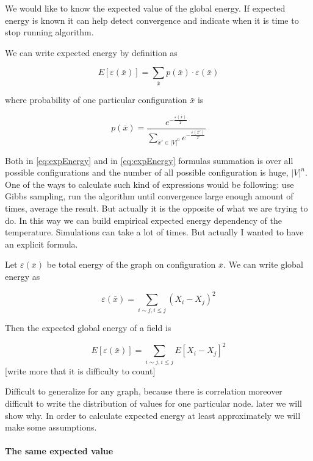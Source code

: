 \documentclass[12pt]{report}
\begin{document}
We would like to know the expected value of the global energy. 
If expected energy is known it can help detect convergence and indicate when it is time to stop running algorithm. 


We can write expected energy by definition as

\begin{equation}
E[\varepsilon (\bar{x})] = \sum\limits_{\bar{x}} p(\bar{x}) \cdot \varepsilon(\bar{x})
\end{equation}\label{eq:expEnergy}


where probability of one particular configuration $\bar{x}$ is  

\begin{equation}
p(\bar{x}) = \frac{ e^{-\frac{ \varepsilon (\bar{x})}{T}} }{ \sum\limits_{\bar{x}'\in |V|^n} e^{-\frac{\varepsilon(\bar{x}')}{T}}} 
\end{equation}\label{eq:prob}

Both in \ref{eq:expEnergy} and in \ref{eq:expEnergy} formulas summation is over all possible configurations and the number of all possible configuration is huge, $|V|^n$. One of the ways to calculate such kind of expressions would be following: use Gibbs sampling, run the algorithm until convergence large enough amount of times, average the result. But actually it is the opposite of what we are trying to do. In this way we can build empirical expected energy dependency of the temperature. Simulations can take a lot of times. But actually I wanted to have an explicit formula.

Let $ \varepsilon (\bar{x})$ be total energy of the graph on configuration $\bar{x}$. We can write global energy as 


$$ \varepsilon (\bar{x}) =  \sum_{i \sim j, i \leq j} (X_i - X_j)^2  $$

Then the expected global energy of a field is

$$ E[\varepsilon (\bar{x})] =  \sum_{i \sim j, i \leq j} E[X_i - X_j]^2  $$
 [write more that it is difficulty to count]
 
Difficult to generalize for any graph, because there is correlation
moreover difficult to write the distribution of values for one particular node. later we will show why.
In order to calculate expected energy at least approximately we will make some assumptions.

\paragraph{The same expected value}
\mbox{} \\
\end{document}
